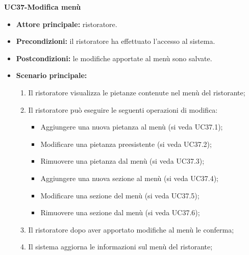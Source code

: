 

\textbf{UC37-Modifica menù}  
\begin{itemize}
    \item \textbf{Attore principale:} ristoratore.
    \item \textbf{Precondizioni:} il ristoratore ha effettuato l'accesso al sistema.
    \item \textbf{Postcondizioni:} le modifiche apportate al menù sono salvate.
    \item \textbf{Scenario principale:}
    \begin{enumerate}
        \item Il ristoratore visualizza le pietanze contenute nel menù del ristorante;
        \item Il ristoratore può eseguire le seguenti operazioni di modifica:
        \begin{itemize}
           \item Aggiungere una nuova pietanza al menù (si veda UC37.1);
           \item Modificare una pietanza preesistente (si veda UC37.2);
           \item Rimuovere una pietanza dal menù (si veda UC37.3);
           \item Aggiungere una nuova sezione al menù (si veda UC37.4);
           \item Modificare una sezione del menù (si veda UC37.5);
           \item Rimuovere una sezione dal menù (si veda UC37.6);
        \end{itemize}
        \item Il ristoratore dopo aver apportato modifiche al menù le conferma;
        \item Il sistema aggiorna le informazioni sul menù del ristorante;
    \end{enumerate}
\end{itemize}

